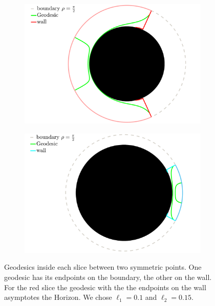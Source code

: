 \begin{figure}
    \centering
    \begin{subfigure}[b]{0.45\textwidth}
        \centering
        \includegraphics[width=\textwidth]{figures/geodesic_red.png}
        \label{greengeodesic}
    \end{subfigure}
    \hfill
    \begin{subfigure}[b]{0.45\textwidth}
        \centering
        \includegraphics[width=\textwidth]{figures/geodesic_blue.png}
        \label{pinkgeodesic}
    \end{subfigure}
        \caption{Geodesics inside each slice between two symmetric points. One geodesic has its endpoints on the boundary, the other on the wall. For the red slice the geodesic with the the endpoints on the wall asymptotes the Horizon. We chose $\ell_1=0.1$ and $\ell_2=0.15$.}
        \label{geodesic pic}
\end{figure}

